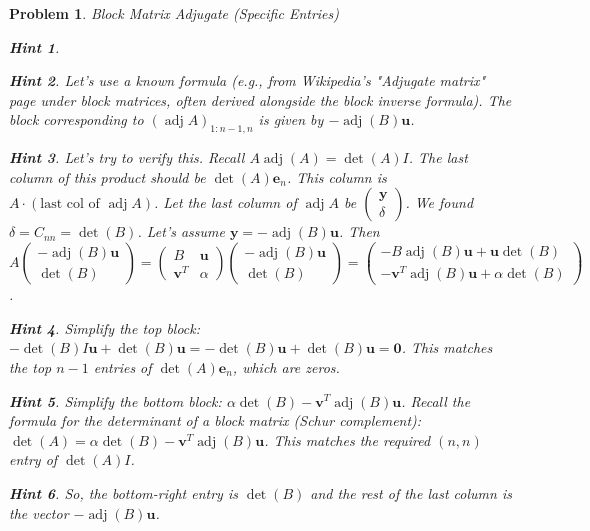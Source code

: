 \documentclass[12pt]{article}
\newtheorem{problem}{Problem}[section]
\theoremstyle{definition}
\newtheorem{hint}{Hint}[question]
\newcommand{\adj}{\operatorname{adj}}
\newcommand{\detm}{\operatorname{det}}
\newcommand{\vect}[1]{\mathbf{#1}} %
\begin{document}
\begin{problem}{Block Matrix Adjugate (Specific Entries)}
\begin{hint}
    \end{hint}
    \begin{hint}
        Let's use a known formula (e.g., from Wikipedia's "Adjugate matrix" page under block matrices, often derived alongside the block inverse formula). The block corresponding to $(\adj A)_{1:n-1, n}$ is given by $-\adj(B) \vect{u}$.
    \end{hint}
    \begin{hint}
        Let's try to verify this. Recall $A \adj(A) = \detm(A) I$. The last column of this product should be $\detm(A) \vect{e}_n$.
        This column is $A \cdot (\text{last col of } \adj A)$. Let the last column of $\adj A$ be $\begin{pmatrix} \vect{y} \\ \delta \end{pmatrix}$.
        We found $\delta = C_{nn} = \detm(B)$. Let's assume $\vect{y} = -\adj(B)\vect{u}$.
        Then $A \begin{pmatrix} -\adj(B)\vect{u} \\ \detm(B) \end{pmatrix} = \begin{pmatrix} B & \vect{u} \\ \vect{v}^T & \alpha \end{pmatrix} \begin{pmatrix} -\adj(B)\vect{u} \\ \detm(B) \end{pmatrix} = \begin{pmatrix} -B\adj(B)\vect{u} + \vect{u}\detm(B) \\ -\vect{v}^T\adj(B)\vect{u} + \alpha\detm(B) \end{pmatrix}$.
    \end{hint}
    \begin{hint}
        Simplify the top block: $-\detm(B)I \vect{u} + \detm(B)\vect{u} = -\detm(B)\vect{u} + \detm(B)\vect{u} = \vect{0}$. This matches the top $n-1$ entries of $\detm(A) \vect{e}_n$, which are zeros.
    \end{hint}
    \begin{hint}
        Simplify the bottom block: $\alpha\detm(B) - \vect{v}^T\adj(B)\vect{u}$. Recall the formula for the determinant of a block matrix (Schur complement): $\detm(A) = \alpha \detm(B) - \vect{v}^T \adj(B) \vect{u}$. This matches the required $(n,n)$ entry of $\detm(A)I$.
    \end{hint}
    \begin{hint}
        So, the bottom-right entry is $\detm(B)$ and the rest of the last column is the vector $-\adj(B)\vect{u}$.
    \end{hint}


\end{problem}
\end{document}
